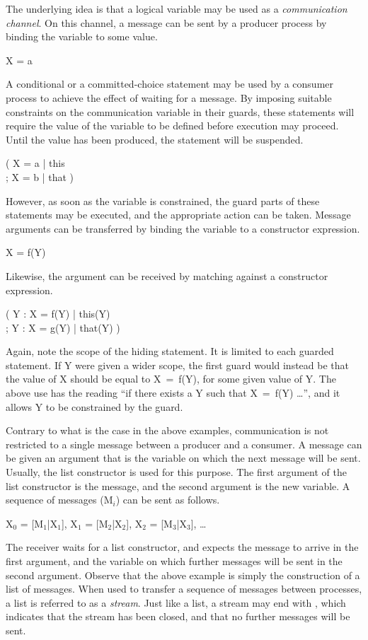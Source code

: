 The underlying idea is that a logical variable may be used as a {\em
communication channel}.  On this channel, a message can be sent by a
producer process by binding the variable to some value.
%
\begin{progex}
X = a
\end{progex}%
%
A conditional or a committed-choice statement may be used by a
consumer process to achieve the effect of waiting for a message.  By
imposing suitable constraints on the communication variable in their
guards, these statements will require the value of the variable to be
defined before execution may proceed.  Until the value has been
produced, the statement will be suspended.
%
\begin{progex}
( X = a | this \\
; X = b | that )
\end{progex}%
%
However, as soon as the variable is constrained, the guard parts of
these statements may be executed, and the appropriate action can be
taken.  Message arguments can be transferred by binding the variable
to a constructor expression.
%
\begin{progex}
X = f(Y)
\end{progex}%
%
Likewise, the argument can be received by matching against a
constructor expression.
%
\begin{progex}
( Y : X = f(Y) | this(Y) \\
; Y : X = g(Y) | that(Y) )
\end{progex}%
%
Again, note the scope of the hiding statement.  It is limited to each
guarded statement.  If {\prog Y} were given a wider scope, the first
guard would instead be that the value of {\prog X} should be equal to
{\prog X~=~f(Y)}, for some given value of {\prog Y}.  The above use
has the reading ``if there exists a {\prog Y} such that {\prog
X~=~f(Y)} \dots'', and it allows {\prog Y} to be constrained by the
guard.

Contrary to what is the case in the above examples, communication is
not restricted to a single message between a producer and a
consumer.  A message can be given an argument that is the variable on
which the next message will be sent.  Usually, the list constructor is
used for this purpose.  The first argument of the list constructor is
the message, and the second argument is the new variable.  A sequence
of messages ({\prog M$_i$}) can be sent as follows.
%
\begin{progex}
X$_0$ = [M$_1$|X$_1$], X$_1$ = [M$_2$|X$_2$], X$_2$ = [M$_3$|X$_3$], \dots
\end{progex}%
%
The receiver waits for a list constructor, and expects the message to
arrive in the first argument, and the variable on which further
messages will be sent in the second argument.  Observe that the above
example is simply the construction of a list of messages.  When used
to transfer a sequence of messages between processes, a list is
referred to as a {\em stream}.  Just like a list, a stream may end
with {\prog []}, which indicates that the stream has been closed, and
that no further messages will be sent.

